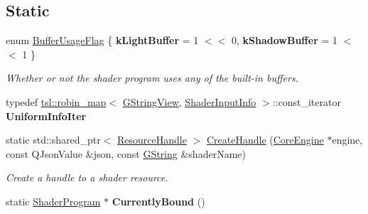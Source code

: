 \subsection*{Static}
\begin{DoxyCompactItemize}
\item 
\mbox{\label{classrev_1_1_shader_program_a4ee618c46bc807822429a59aa11dfa63}} 
enum \mbox{\hyperlink{classrev_1_1_shader_program_a4ee618c46bc807822429a59aa11dfa63}{Buffer\+Usage\+Flag}} \{ {\bfseries k\+Light\+Buffer} = 1 $<$$<$ 0, 
{\bfseries k\+Shadow\+Buffer} = 1 $<$$<$ 1
 \}
\begin{DoxyCompactList}\small\item\em Whether or not the shader program uses any of the built-\/in buffers. \end{DoxyCompactList}\item 
\mbox{\label{classrev_1_1_shader_program_ad387bf22d3c44c8864acadc8a5c671e8}} 
typedef \mbox{\hyperlink{classtsl_1_1robin__map}{tsl\+::robin\+\_\+map}}$<$ \mbox{\hyperlink{classrev_1_1_g_string_view}{G\+String\+View}}, \mbox{\hyperlink{structrev_1_1_shader_input_info}{Shader\+Input\+Info}} $>$\+::const\+\_\+iterator {\bfseries Uniform\+Info\+Iter}
\item 
\mbox{\label{classrev_1_1_shader_program_a9700792334a949387a74c1801be2e746}} 
static std\+::shared\+\_\+ptr$<$ \mbox{\hyperlink{classrev_1_1_resource_handle}{Resource\+Handle}} $>$ \mbox{\hyperlink{classrev_1_1_shader_program_a9700792334a949387a74c1801be2e746}{Create\+Handle}} (\mbox{\hyperlink{classrev_1_1_core_engine}{Core\+Engine}} $\ast$engine, const Q\+Json\+Value \&json, const \mbox{\hyperlink{classrev_1_1_g_string}{G\+String}} \&shader\+Name)
\begin{DoxyCompactList}\small\item\em Create a handle to a shader resource. \end{DoxyCompactList}\item 
\mbox{\label{classrev_1_1_shader_program_ab443109faca272067f3577b561aecc9c}} 
static \mbox{\hyperlink{classrev_1_1_shader_program}{Shader\+Program}} $\ast$ {\bfseries Currently\+Bound} ()
\item 
\mbox{\label{classrev_1_1_shader_program_a9fb09af1c3867c41b10edddcd3cc3088}} 

\end{DoxyCompactItemize}
